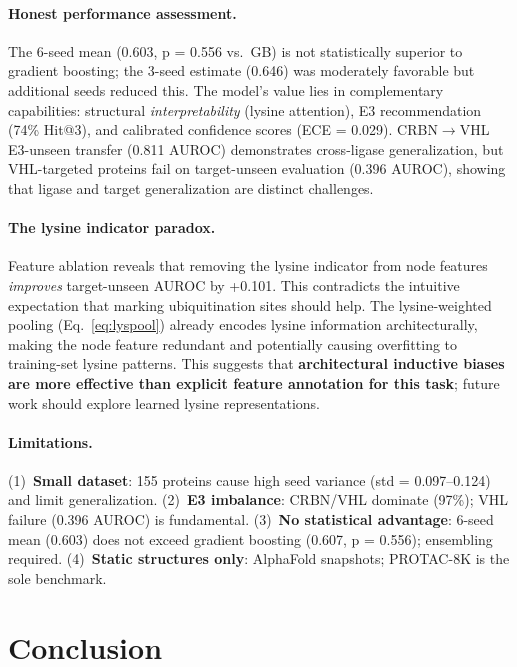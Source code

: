 \documentclass[sigconf]{acmart}
\begin{document}
\paragraph{Honest performance assessment.}
The 6-seed mean (0.603, p = 0.556 vs.\ GB) is not statistically superior to gradient boosting; the 3-seed estimate (0.646) was moderately favorable but additional seeds reduced this.
The model's value lies in complementary capabilities: structural \emph{interpretability} (lysine attention), E3 recommendation (74\% Hit@3), and calibrated confidence scores (ECE = 0.029).
CRBN$\to$VHL E3-unseen transfer (0.811 AUROC) demonstrates cross-ligase generalization, but VHL-targeted proteins fail on target-unseen evaluation (0.396 AUROC), showing that ligase and target generalization are distinct challenges.

\paragraph{The lysine indicator paradox.}
Feature ablation reveals that removing the lysine indicator from node features \emph{improves} target-unseen AUROC by +0.101.
This contradicts the intuitive expectation that marking ubiquitination sites should help.
The lysine-weighted pooling (Eq.~\ref{eq:lyspool}) already encodes lysine information architecturally, making the node feature redundant and potentially causing overfitting to training-set lysine patterns.
This suggests that \textbf{architectural inductive biases are more effective than explicit feature annotation for this task}; future work should explore learned lysine representations.

\paragraph{Limitations.}
(1)~\textbf{Small dataset}: 155 proteins cause high seed variance (std = 0.097--0.124) and limit generalization.
(2)~\textbf{E3 imbalance}: CRBN/VHL dominate (97\%); VHL failure (0.396 AUROC) is fundamental.
(3)~\textbf{No statistical advantage}: 6-seed mean (0.603) does not exceed gradient boosting (0.607, p = 0.556); ensembling required.
(4)~\textbf{Static structures only}: AlphaFold snapshots; PROTAC-8K is the sole benchmark.



\section{Conclusion}
\label{sec:conclusion}
\end{document}
